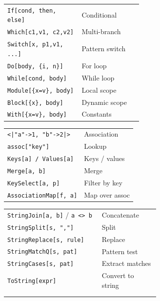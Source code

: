 \documentclass[10pt]{extarticle}
\begin{document}
\begin{multicols}{2}
\begin{tabularx}{\linewidth}{@{}>{\raggedright\arraybackslash}p{0.55\linewidth}@{\enspace}Y@{}}
\texttt{If[cond, then, else]}      & Conditional \\
\texttt{Which[c1,v1, c2,v2]}      & Multi-branch \\
\texttt{Switch[x, p1,v1, ...]}    & Pattern switch \\
\texttt{Do[body, \{i, n\}]}       & For loop \\
\texttt{While[cond, body]}         & While loop \\
\texttt{Module[\{x=v\}, body]}    & Local scope \\
\texttt{Block[\{x\}, body]}       & Dynamic scope \\
\texttt{With[\{x=v\}, body]}      & Constants \\
\end{tabularx}

\begin{tabularx}{\linewidth}{@{}l@{\enspace}Y@{}}
\texttt{<|"a"->1, "b"->2|>}       & Association \\
\texttt{assoc["key"]}              & Lookup \\
\texttt{Keys[a] / Values[a]}      & Keys / values \\
\texttt{Merge[a, b]}              & Merge \\
\texttt{KeySelect[a, p]}          & Filter by key \\
\texttt{AssociationMap[f, a]}     & Map over assoc \\
\end{tabularx}

\begin{tabularx}{\linewidth}{@{}>{\raggedright\arraybackslash}p{0.62\linewidth}@{\enspace}Y@{}}
\texttt{StringJoin[a, b]} / \texttt{a <> b}  & Concatenate \\
\texttt{StringSplit[s, ","]}       & Split \\
\texttt{StringReplace[s, rule]}    & Replace \\
\texttt{StringMatchQ[s, pat]}      & Pattern test \\
\texttt{StringCases[s, pat]}       & Extract matches \\
\texttt{ToString[expr]}            & Convert to string \\
 & \\
 \\
\end{tabularx}


\end{multicols}
\end{document}
